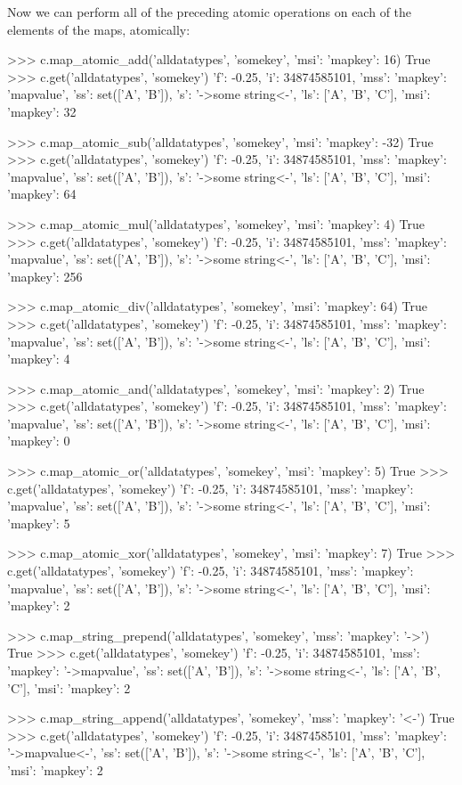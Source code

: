 Now we can perform all of the preceding atomic operations on each of the
elements of the maps, atomically:

\begin{pythoncode}
>>> c.map_atomic_add('alldatatypes', 'somekey', {'msi': {'mapkey': 16}})
True
>>> c.get('alldatatypes', 'somekey')
{'f': -0.25, 'i': 34874585101, 'mss': {'mapkey': 'mapvalue'}, 'ss': set(['A', 'B']), 's': '->some string<-', 'ls': ['A', 'B', 'C'], 'msi': {'mapkey': 32}}

>>> c.map_atomic_sub('alldatatypes', 'somekey', {'msi': {'mapkey': -32}})
True
>>> c.get('alldatatypes', 'somekey')
{'f': -0.25, 'i': 34874585101, 'mss': {'mapkey': 'mapvalue'}, 'ss': set(['A', 'B']), 's': '->some string<-', 'ls': ['A', 'B', 'C'], 'msi': {'mapkey': 64}}

>>> c.map_atomic_mul('alldatatypes', 'somekey', {'msi': {'mapkey': 4}})
True
>>> c.get('alldatatypes', 'somekey')
{'f': -0.25, 'i': 34874585101, 'mss': {'mapkey': 'mapvalue'}, 'ss': set(['A', 'B']), 's': '->some string<-', 'ls': ['A', 'B', 'C'], 'msi': {'mapkey': 256}}

>>> c.map_atomic_div('alldatatypes', 'somekey', {'msi': {'mapkey': 64}})
True
>>> c.get('alldatatypes', 'somekey')
{'f': -0.25, 'i': 34874585101, 'mss': {'mapkey': 'mapvalue'}, 'ss': set(['A', 'B']), 's': '->some string<-', 'ls': ['A', 'B', 'C'], 'msi': {'mapkey': 4}}

>>> c.map_atomic_and('alldatatypes', 'somekey', {'msi': {'mapkey': 2}})
True
>>> c.get('alldatatypes', 'somekey')
{'f': -0.25, 'i': 34874585101, 'mss': {'mapkey': 'mapvalue'}, 'ss': set(['A', 'B']), 's': '->some string<-', 'ls': ['A', 'B', 'C'], 'msi': {'mapkey': 0}}

>>> c.map_atomic_or('alldatatypes', 'somekey', {'msi': {'mapkey': 5}})
True
>>> c.get('alldatatypes', 'somekey')
{'f': -0.25, 'i': 34874585101, 'mss': {'mapkey': 'mapvalue'}, 'ss': set(['A', 'B']), 's': '->some string<-', 'ls': ['A', 'B', 'C'], 'msi': {'mapkey': 5}}

>>> c.map_atomic_xor('alldatatypes', 'somekey', {'msi': {'mapkey': 7}})
True
>>> c.get('alldatatypes', 'somekey')
{'f': -0.25, 'i': 34874585101, 'mss': {'mapkey': 'mapvalue'}, 'ss': set(['A', 'B']), 's': '->some string<-', 'ls': ['A', 'B', 'C'], 'msi': {'mapkey': 2}}

>>> c.map_string_prepend('alldatatypes', 'somekey', {'mss': {'mapkey': '->'}})
True
>>> c.get('alldatatypes', 'somekey')
{'f': -0.25, 'i': 34874585101, 'mss': {'mapkey': '->mapvalue'}, 'ss': set(['A', 'B']), 's': '->some string<-', 'ls': ['A', 'B', 'C'], 'msi': {'mapkey': 2}}

>>> c.map_string_append('alldatatypes', 'somekey', {'mss': {'mapkey': '<-'}})
True
>>> c.get('alldatatypes', 'somekey')
{'f': -0.25, 'i': 34874585101, 'mss': {'mapkey': '->mapvalue<-'}, 'ss': set(['A', 'B']), 's': '->some string<-', 'ls': ['A', 'B', 'C'], 'msi': {'mapkey': 2}}
\end{pythoncode}

